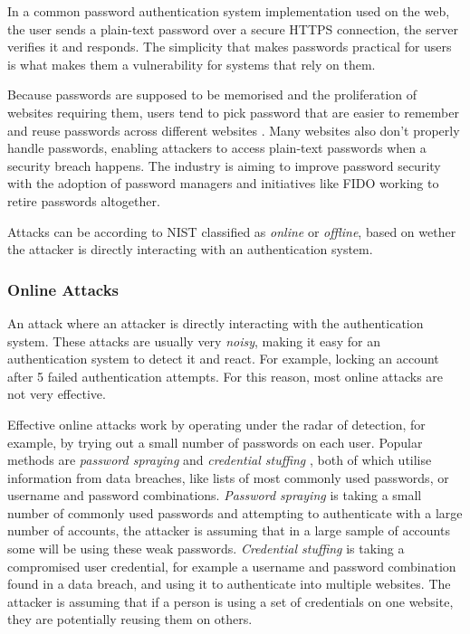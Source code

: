 In a common password authentication system implementation used on the web, the user sends a plain-text password over a secure HTTPS connection, the server verifies it and responds.
The simplicity that makes passwords practical for users is what makes them a vulnerability for systems that rely on them.

Because passwords are supposed to be memorised and the proliferation of websites requiring them, users tend to pick password that are easier to remember and reuse passwords across different websites \cite{conklin2004password}.
Many websites also don't properly handle passwords, enabling attackers to access plain-text passwords when a security breach happens.
The industry is aiming to improve password security with the adoption of password managers and initiatives like FIDO \cite{balfanz2013fido} working to retire passwords altogether.

Attacks can be according to NIST \cite{grassi2017} classified as \textit{online} or \textit{offline}, based on wether the attacker is directly interacting with an authentication system.


\subsubsection{Online Attacks} An attack where an attacker is directly interacting with the authentication system.
These attacks are usually very \textit{noisy}, making it easy for an authentication system to detect it and react.
For example, locking an account after 5 failed authentication attempts.
For this reason, most online attacks are not very effective.

Effective online attacks work by operating under the radar of detection, for example, by trying out a small number of passwords on each user.
Popular methods are \textit{password spraying} and \textit{credential stuffing} \cite{haber2020attack}, both of which utilise information from data breaches, like lists of most commonly used passwords, or username and password combinations.
\textit{Password spraying} is taking a small number of commonly used passwords and attempting to authenticate with a large number of accounts, the attacker is assuming that in a large sample of accounts some will be using these weak passwords.
\textit{Credential stuffing} is taking a compromised user credential, for example a username and password combination found in a data breach, and using it to authenticate into multiple websites.
The attacker is assuming that if a person is using a set of credentials on one website, they are potentially reusing them on others.

